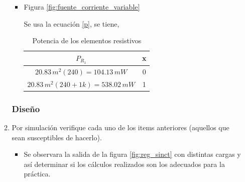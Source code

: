 \begin{enumerate}
\begin{enumerate}
\begin{itemize}
                    \item Figura \ref{fig:fuente_corriente_variable}

                        Se usa la ecuación \ref{p}, se tiene,

                        \begin{table}[h]
                          \centering
                          \begin{tabular}{|c|c|}
                            \hline
                            \textbf{$P_{R_1}$} & \textbf{x} \\
                            \hline
                            $20.83 \, m^2 (240) = 104.13 \, mW$ & 0 \\
                            \hline
                            $20.83 \, m^2 (240 + 1k) = 538.02 \, mW$ & 1 \\
                            \hline
                          \end{tabular}
                          \caption{Potencia de los elementos resistivos}
                        \end{table}
                    \end{itemize}
    \subsubsection{Diseño}
    
                \item Por simulación verifique cada uno de los items anteriores (aquellos que sean susceptibles de hacerlo).
                    \begin{itemize}
                        \item  Se observara la salida de la figura \ref{fig:reg_sinct} con distintas cargas y así determinar si los cálculos realizados son los adecuados para la práctica.
                    
                   



\end{itemize}
\end{enumerate}
\end{enumerate}
